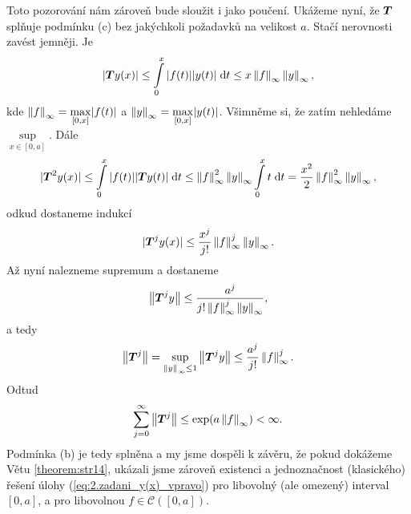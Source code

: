 Toto pozorování nám zároveň bude sloužit i jako poučení. Ukážeme nyní, že $ \boldsymbol{T} $ splňuje podmínku (c) bez jakýchkoli požadavků na velikost $a$. Stačí nerovnosti zavést jemněji. Je 
$$| \boldsymbol{T} y(x)|\leq \int\limits_0^x|f(t)||y(t)|\;\mathrm{d}t\leq x\left\lVert f\right\rVert_\infty\left\lVert y\right\rVert_\infty,$$
kde $\left\lVert f\right\rVert_\infty = \underset{[0,x]}{\max} |f(t)|$ a $\left\lVert y\right\rVert_\infty = \underset{[0,x]}{\max} |y(t)|$. Všimněme si, že zatím nehledáme $\sup\limits_{x\in[0,a]}$. Dále
$$| \boldsymbol{T} ^2y(x)|\leq\int\limits_0^x|f(t)|| \boldsymbol{T} y(t)|\;\mathrm{d}t\leq \left\lVert f\right\rVert^2_\infty\left\lVert y\right\rVert_\infty\int\limits_0^xt\;\mathrm{d}t = \frac{x^2}{2}\left\lVert f\right\rVert^2_\infty\left\lVert y\right\rVert_\infty,$$
odkud dostaneme indukcí
$$| \boldsymbol{T} ^jy(x)|\leq\frac{x^j}{j!}\left\lVert f\right\rVert^j_\infty\left\lVert y\right\rVert_\infty.$$
Až nyní nalezneme supremum a dostaneme 
$$\left\lVert \boldsymbol{T} ^jy\right\rVert\leq\frac{a^j}{j!\left\lVert f\right\rVert^j_\infty\left\lVert y\right\rVert_\infty},$$ a tedy 
$$\left\lVert \boldsymbol{T} ^j\right\rVert=\sup\limits_{\left\lVert y\right\rVert_\infty\leq 1}\left\lVert \boldsymbol{T} ^jy\right\rVert\leq\frac{a^j}{j!}\left\lVert f\right\rVert^j_\infty.$$
Odtud $$\sum\limits_{j=0}^\infty\left\lVert \boldsymbol{T} ^j\right\rVert\leq\exp(a\left\lVert f\right\rVert_\infty)<\infty.$$
Podmínka (b) je tedy splněna a my jsme dospěli k závěru, že pokud dokážeme Větu \ref{theorem:str14}, ukázali jsme zároveň existenci a jednoznačnost (klasického) řešení úlohy (\ref{eq:2.zadani_y(x)_vpravo}) pro libovolný (ale omezený) interval $[0,a]$, a pro libovolnou $f\in\mathcal{C}([0,a])$.

